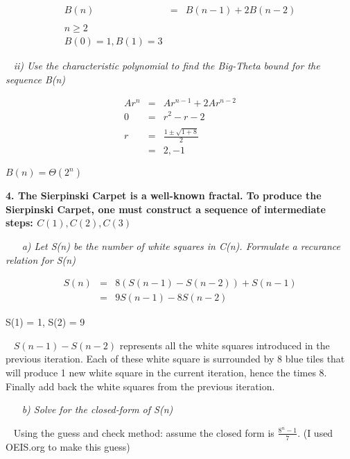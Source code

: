 \documentclass[12pt, letterpaper]{article}
\begin{document}
\begin{eqnarray*}
    B(n) &=& B(n - 1) + 2B(n - 2) \\
    \\ n \ge 2 \\
    B(0) = 1, B(1) = 3
\end{eqnarray*}

\-\ \newline
\it{ ii) Use the characteristic polynomial to find the Big-Theta bound for the sequence B(n) }

\begin{eqnarray*}
    Ar^n &=& Ar^{n-1} + 2Ar^{n-2} \\
    0 &=& r^2 - r - 2 \\
    \\
    r &=& \frac{ 1 \pm \sqrt{1 + 8} }{2} \\
    &=& 2, -1
\end{eqnarray*}

\textnormal{\( B(n) = \Theta(2^n) \)}



\newpage
\bf{ 4. The Sierpinski Carpet is a well-known fractal. To produce the Sierpinski Carpet, one must construct a sequence of intermediate steps: \(C(1), C(2), C(3)\) }

\-\ \newline
\-\ \it{ a) Let S(n) be the number of white squares in C(n). Formulate a recurance relation for S(n) }

\begin{eqnarray*}
S(n) &=& 8(S(n - 1) - S(n - 2)) + S(n - 1) \\
&=& 9S(n - 1) - 8S(n - 2)
\end{eqnarray*}

\textnormal{ S(1) = 1, S(2) = 9 } 

\-\ \newline
\textnormal{ \(S(n - 1) - S(n - 2)\) represents all the white squares introduced in the previous iteration. Each of these white square is surrounded by 8 blue tiles that will produce 1 new white square in the current iteration, hence the times 8. Finally add back the white squares from the previous iteration.  }

\-\ \newline
\-\ \it{ b) Solve for the closed-form of S(n) }

\-\ \newline
\textnormal{ Using the guess and check method: assume the closed form is \(\frac{8^n - 1}{7}\). (I used OEIS.org to make this guess) }
\end{document}
